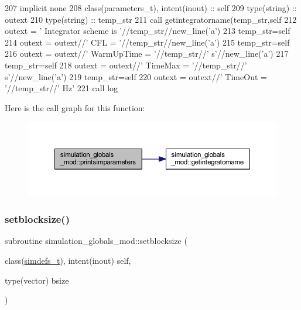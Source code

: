 \begin{DoxyCode}
207     \textcolor{keywordtype}{implicit none}
208     \textcolor{keywordtype}{class}(parameters\_t), \textcolor{keywordtype}{intent(inout)} :: self
209     \textcolor{keywordtype}{type}(string) :: outext
210     \textcolor{keywordtype}{type}(string) :: temp\_str
211     \textcolor{keyword}{call }getintegratorname(temp\_str,self%
212     outext = \textcolor{stringliteral}{'      Integrator scheme is '}//temp\_str//new\_line(\textcolor{stringliteral}{'a'})
213     temp\_str=self%
214     outext = outext//\textcolor{stringliteral}{'       CFL = '}//temp\_str//new\_line(\textcolor{stringliteral}{'a'})
215     temp\_str=self%
216     outext = outext//\textcolor{stringliteral}{'       WarmUpTime = '}//temp\_str//\textcolor{stringliteral}{' s'}//new\_line(\textcolor{stringliteral}{'a'})
217     temp\_str=self%
218     outext = outext//\textcolor{stringliteral}{'       TimeMax = '}//temp\_str//\textcolor{stringliteral}{' s'}//new\_line(\textcolor{stringliteral}{'a'})
219     temp\_str=self%
220     outext = outext//\textcolor{stringliteral}{'       TimeOut = '}//temp\_str//\textcolor{stringliteral}{' Hz'}
221     \textcolor{keyword}{call }log%
\end{DoxyCode}
Here is the call graph for this function\+:\nopagebreak
\begin{figure}[H]
\begin{center}
\leavevmode
\includegraphics[width=350pt]{namespacesimulation__globals__mod_a97c04d0289a9f2d004a9329cb7ab16f0_cgraph}
\end{center}
\end{figure}
\mbox{\label{namespacesimulation__globals__mod_aa65b43534d2d2b6366a4ebc791194805}} 
\subsubsection{\texorpdfstring{setblocksize()}{setblocksize()}}
{\footnotesize\ttfamily subroutine simulation\+\_\+globals\+\_\+mod\+::setblocksize (\begin{DoxyParamCaption}\item[{class(\mbox{\hyperlink{structsimulation__globals__mod_1_1simdefs__t}{simdefs\+\_\+t}}), intent(inout)}]{self,  }\item[{type(vector)}]{bsize }\end{DoxyParamCaption})\hspace{0.3cm}{\ttfamily [private]}}



